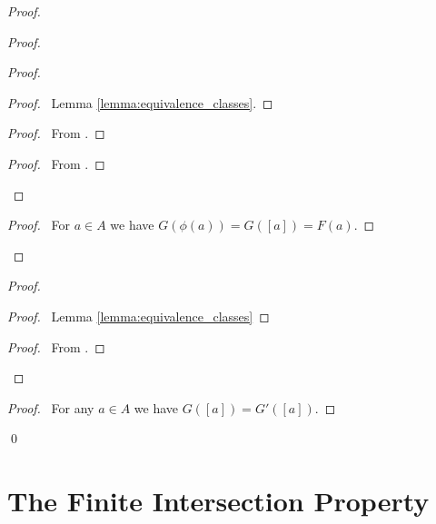 \begin{proof}
    \pf
    \begin{proof}
        \begin{proof}
            \begin{proof}
                \pf\ Lemma \ref{lemma:equivalence_classes}.
            \end{proof}
            \begin{proof}
                \pf\ From .
            \end{proof}
            \begin{proof}
                \pf\ From .
            \end{proof}
        \end{proof}
        \begin{proof}
            \pf\ For $a \in A$ we have $G(\phi(a)) = G([a]) = F(a)$.
        \end{proof}
    \end{proof}
    \begin{proof}
        \begin{proof}
            \pf\ Lemma \ref{lemma:equivalence_classes}
        \end{proof}
        \begin{proof}
            \pf\ From .
        \end{proof}
    \end{proof}
    \begin{proof}
        \pf\ For any $a \in A$ we have $G([a]) = G'([a])$.
    \end{proof}
    \qed
\end{proof}

\section{The Finite Intersection Property}

